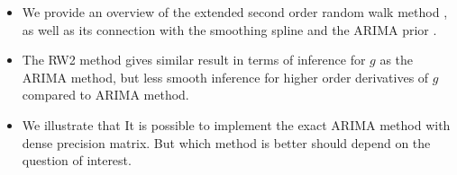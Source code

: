 \documentclass{beamer} %
\begin{document}
\begin{frame}
\begin{itemize}

\item We provide an overview of the extended second order random walk method \citep{rw2}, as well as its connection with the smoothing spline \citep{wahba} and the ARIMA prior \citep{ARIMA}.

\pause

\item The RW2 method gives similar result in terms of inference for $g$ as the ARIMA method, but less smooth inference for higher order derivatives of $g$ compared to ARIMA method.

\pause


\pause

\item We illustrate that It is possible to implement the exact ARIMA method with dense precision matrix. But which method is better should depend on the question of interest.

\end{itemize}
\end{frame}











\end{document}
